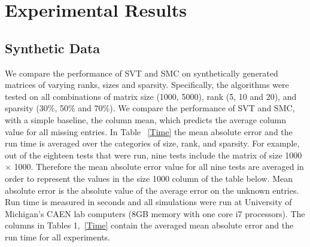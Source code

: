 \documentclass{article} %
\begin{document}
\section{Experimental Results}

\subsection{Synthetic Data}

We compare the performance of SVT and SMC on synthetically generated
matrices of varying ranks, sizes and sparsity. Specifically, the
algorithms were tested on all combinations of matrix size (1000,
5000), rank (5, 10 and 20), and sparsity (30\%, 50\% and 70\%). We
compare the performance of SVT and SMC, with a simple baseline, the
column mean, which predicts the average column value for all missing
entries. In Table ~\ref{Time} the mean absolute error and the run time
is averaged over the categories of size, rank, and sparsity. For
example, out of the eighteen tests that were run, nine tests include
the matrix of size 1000 $\times$ 1000. Therefore the mean absolute
error value for all nine tests are averaged in order to represent the
values in the size 1000 column of the table below. Mean absolute error
is the absolute value of the average error on the unknown entries. Run
time is measured in seconds and all simulations were run at University
of Michigan's CAEN lab computers (8GB memory with one core i7
processors). The columns in Tables 1,~\ref{Time} contain the averaged
mean absolute error and the run time for all experiments.







\end{document}
